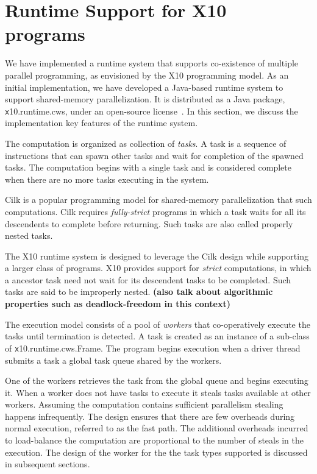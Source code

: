 \section{Runtime Support for X10 programs}
\label{s:runtime}

We have implemented a runtime system that supports co-existence of
multiple parallel programming, as envisioned by the X10 programming
model. As an initial implementation, we have developed a Java-based
runtime system to support shared-memory parallelization. It is
distributed as a Java package, {\texttt x10.runtime.cws}, under an
open-source license~\cite{x10-webpage}. In this section, we discuss the
implementation key features of the runtime system.

The computation is organized as collection of {\em tasks}. A task is a
sequence of instructions that can spawn other tasks and wait for
completion of the spawned tasks. The computation begins with a single
task and is considered complete when there are no more tasks executing
in the system. 

Cilk is a popular programming model for shared-memory parallelization
that such computations. Cilk requires {\em fully-strict} programs
in which a task waits for all its descendents to complete before
returning. Such tasks are also called properly nested tasks. 

The X10 runtime system is designed to leverage the Cilk design while
supporting a larger class of programs. X10 provides support for {\em
strict} computations, in which a ancestor task need not wait for its
descendent tasks to be completed. Such tasks are said to be improperly
nested. {\bf (also talk about algorithmic properties such as
deadlock-freedom in this context)}

The execution model consists of a pool of {\em workers} that
co-operatively execute the tasks until termination is detected. A task
is created as an instance of a sub-class of {\texttt
x10.runtime.cws.Frame}. The program begins execution when a driver
thread submits a task a global task queue shared by the workers. 

One of the workers retrieves the task from the global queue and begins
executing it. When a worker does not have tasks to execute it steals
tasks available at other workers. Assuming the computation contains
sufficient parallelism stealing happens infrequently. The design
ensures that there are few overheads during normal execution, referred
to as the fast path. The additional overheads incurred to load-balance
the computation are proportional to the number of steals in the
execution. The design of the worker for the the task types supported
is discussed in subsequent sections.

